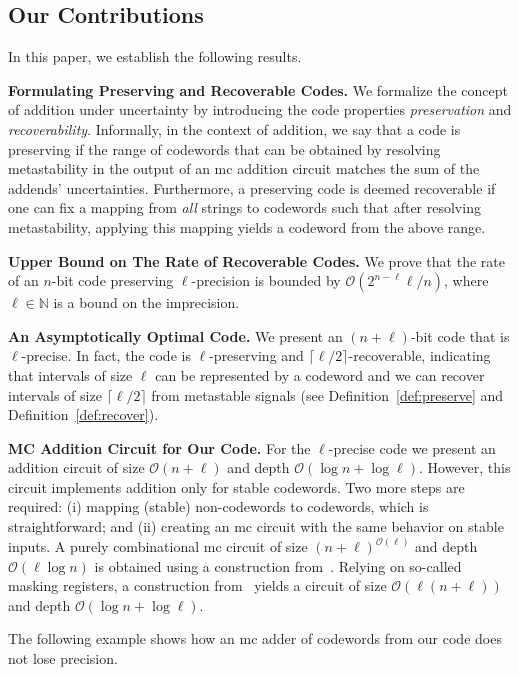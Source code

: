 \documentclass[9pt,journal,compsoc]{IEEEtran}
\theoremstyle{remark}
\newcommand{\IN}{\mathbb{N}}
\newcommand{\ceil}[1]{\lceil{#1}\rceil}
\newcommand{\BO}{\mathcal{O}}
\begin{document}
\subsection{Our Contributions}\label{sec:contrib}
In this paper, we establish the following results. 

\medskip
\noindent
\textbf{Formulating Preserving and Recoverable Codes.}
We formalize the concept of addition under uncertainty by introducing the code properties \emph{preservation} and \emph{recoverability}. Informally, in the context of addition, we say that a code is preserving if the range of codewords that can be obtained by resolving metastability in the output of an mc addition circuit matches the sum of the addends' uncertainties. Furthermore, a preserving code is deemed recoverable if one can fix a mapping from \emph{all} strings to codewords such that after resolving metastability, applying this mapping yields a codeword from the above range.

\medskip
\noindent
\textbf{Upper Bound on The Rate of Recoverable Codes.}
We prove that the rate of an $n$-bit code preserving $\ell$-precision is bounded by $\BO(2^{n-\ell}\ell/n)$, where $\ell\in\IN$ is a bound on the imprecision. 

\medskip
\noindent
\textbf{An Asymptotically Optimal Code.}
We present an $(n+\ell)$-bit code that is $\ell$-precise.
In fact, the code is $\ell$-preserving and $\ceil{\ell/2}$-recoverable, 
indicating that intervals of size $\ell$ can be represented by a codeword and 
we can recover intervals of size $\ceil{\ell/2}$ from metastable signals
(see Definition~\ref{def:preserve} and Definition~\ref{def:recover}).

\medskip
\noindent
\textbf{MC Addition Circuit for Our Code.}
For the $\ell$-precise code we present an addition circuit of size $\BO(n+\ell)$ and depth $\BO(\log n + \log \ell)$.
However, this circuit implements addition only for stable codewords.
Two more steps are required: (i) mapping (stable) non-codewords to codewords, which is straightforward; and (ii) creating an mc circuit with the same behavior on stable inputs.
A purely combinational mc circuit of size $(n+\ell)^{\BO(\ell)}$ and depth $\BO(\ell\log n)$ is obtained using a construction from~\cite{ikenmeyer18complexity}.
Relying on so-called masking registers, a construction from~\cite{friedrichs18containing} yields a circuit of size $\BO(\ell(n + \ell))$ and depth $\BO(\log n + \log \ell)$.

\medskip
The following example shows how an mc adder of codewords from our code does not lose precision. 
%
\end{document}
